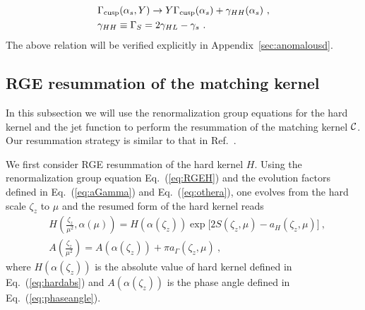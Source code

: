 \documentclass[a4paper,11pt]{article}
\begin{document}
\begin{align}
&\Gamma_{\rm cusp}(\alpha_s,Y)\rightarrow Y\Gamma_{\rm cusp}(\alpha_s)+\gamma_{HH}(\alpha_s) \ , \\ 
&\gamma_{HH}\equiv \Gamma_S=2\gamma_{HL}-\gamma_s \ .
\end{align}
The above relation will be verified explicitly in Appendix~\ref{sec:anomalousd}.

\subsection{RGE resummation of the matching kernel}
In this subsection we will use the renormalization group equations for the hard kernel and the jet function to perform the resummation of the matching kernel ${\cal C}$. Our resummation strategy is similar to that in Ref.~\cite{Becher:2006mr}.

We first consider RGE resummation of the hard kernel $H$. Using the renormalization group equation Eq.~(\ref{eq:RGEH}) and the evolution factors defined in Eq.~(\ref{eq:aGamma}) and Eq.~(\ref{eq:othera}), one evolves from the hard scale $\zeta_z$ to $\mu$ and the resumed form of the hard kernel reads
\begin{align}
&H\left(\frac{\zeta_z}{\mu^2},\alpha(\mu)\right)=H(\alpha(\zeta_z))\exp \bigg[2S(\zeta_z,\mu)-a_{H}(\zeta_z,\mu)\bigg] \ , \\ 
&A\left(\frac{\zeta_z}{\mu^2}\right)=A\left(\alpha(\zeta_z)\right)+\pi a_{\Gamma}(\zeta_z,\mu) \ , \label{eq:phaseRG}
\end{align}
where $H(\alpha(\zeta_z))$ is the absolute value of hard kernel defined in Eq.~(\ref{eq:hardabs}) and $A\left(\alpha(\zeta_z)\right)$ is the phase angle defined in Eq.~(\ref{eq:phaseangle}).
\end{document}
